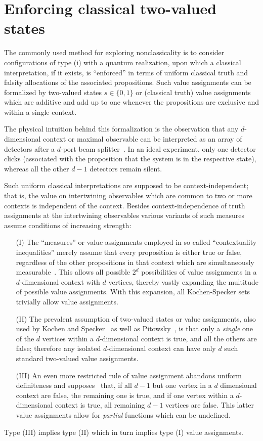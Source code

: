 \documentclass[%
  reprint,
  twocolumn,
 showpacs,
 showkeys,
 preprintnumbers,
 amsmath,amssymb,
 aps,
  prl,
  longbibliography,
 ]{revtex4-1}
\begin{document}
\section{Enforcing classical two-valued states}

The commonly used method for exploring nonclassicality is to consider
configurations of type (i) with a quantum realization, upon which a classical interpretation, if it exists,
is ``enforced'' in terms of uniform classical truth and falsity allocations of the associated propositions.
Such value assignments
can be formalized by two-valued   states $s \in \{0,1\}$ or (classical truth) value assignments
which are additive and add up to one whenever the propositions are exclusive and within a single context.

The physical intuition behind this formalization is the observation that any $d$-dimensional context or maximal observable
can be interpreted as an array of detectors after a $d$-port beam splitter~\cite{rzbb}.
In an ideal experiment, only one detector clicks (associated with the proposition that the system is in the respective state),
whereas all the other $d-1$ detectors remain silent.


Such uniform classical interpretations are supposed to be context-independent;
that is, the value on intertwining observables which are common to two or more contexts is independent
of the context.
Besides context-independence of truth assignments at the intertwining observables various variants of such measures assume conditions of increasing strength:
\begin{itemize}
\item[(I)] The ``measures'' or value assignments employed in so-called ``contextuality inequalities''
merely assume that every proposition is either true or false,
regardless of the other propositions in that context which are simultaneously measurable~\cite{cabello:210401}.
This allows all possible $2^d$ possibilities of value assignments in a $d$-dimensional context with $d$ vertices,
thereby vastly expanding the multitude of possible value assignments.
With this expansion, all Kochen-Specker sets trivially allow value assignments.
\item[(II)] The prevalent assumption of two-valued states or value assignments, also used by Kochen and Specker~\cite{kochen1} as well as Pitowsky~\cite{pitowsky:218},
is that only a {\em single} one of the $d$ vertices within a $d$-dimensional context
is true, and all the others are false; therefore any isolated $d$-dimensional context can have only $d$ such standard two-valued value assignments.
\item[(III)] An even more restricted rule of value assignment abandons uniform definiteness
and supposes~\cite{2012-incomput-proofsCJ,PhysRevA.89.032109,2015-AnalyticKS} that,
if all $d-1$ but one vertex  in a $d$ dimensional context are false, the remaining one is true,
and if one vertex within a $d$-dimensional context is true, all remaining  $d-1$ vertices are false.
This latter value assignments allow for {\em partial} functions which can be undefined.
\end{itemize}
Type (III) implies
type (II) which in turn implies type (I) value assignments.
\end{document}
